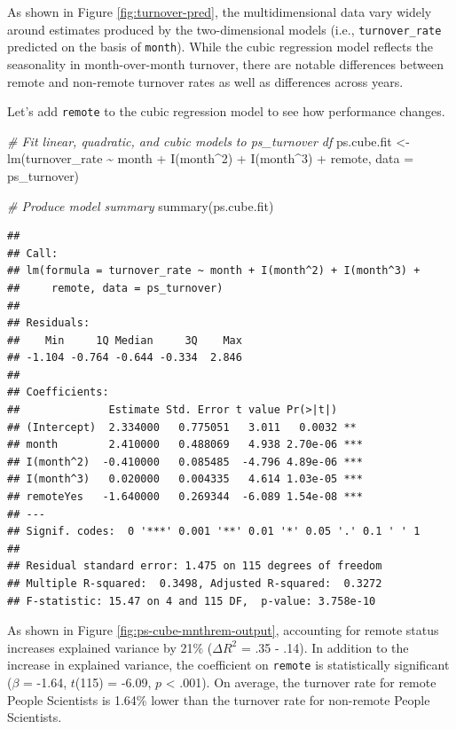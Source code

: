 \documentclass[
]{book}
\newenvironment{Shaded}{\begin{snugshade}}{\end{snugshade}}
\newcommand{\AttributeTok}[1]{\textcolor[rgb]{0.77,0.63,0.00}{#1}}
\newcommand{\CommentTok}[1]{\textcolor[rgb]{0.56,0.35,0.01}{\textit{#1}}}
\newcommand{\DecValTok}[1]{\textcolor[rgb]{0.00,0.00,0.81}{#1}}
\newcommand{\FunctionTok}[1]{\textcolor[rgb]{0.00,0.00,0.00}{#1}}
\newcommand{\NormalTok}[1]{#1}
\newcommand{\OtherTok}[1]{\textcolor[rgb]{0.56,0.35,0.01}{#1}}
\newcommand{\SpecialCharTok}[1]{\textcolor[rgb]{0.00,0.00,0.00}{#1}}
\begin{document}
As shown in Figure \ref{fig:turnover-pred}, the multidimensional data vary widely around estimates produced by the two-dimensional models (i.e., \texttt{turnover\_rate} predicted on the basis of \texttt{month}). While the cubic regression model reflects the seasonality in month-over-month turnover, there are notable differences between remote and non-remote turnover rates as well as differences across years.

Let's add \texttt{remote} to the cubic regression model to see how performance changes.

\begin{Shaded}
\begin{Highlighting}[]
\CommentTok{\# Fit linear, quadratic, and cubic models to ps\_turnover df}
\NormalTok{ps.cube.fit }\OtherTok{\textless{}{-}} \FunctionTok{lm}\NormalTok{(turnover\_rate }\SpecialCharTok{\textasciitilde{}}\NormalTok{ month }\SpecialCharTok{+} \FunctionTok{I}\NormalTok{(month}\SpecialCharTok{\^{}}\DecValTok{2}\NormalTok{) }\SpecialCharTok{+} \FunctionTok{I}\NormalTok{(month}\SpecialCharTok{\^{}}\DecValTok{3}\NormalTok{) }\SpecialCharTok{+}\NormalTok{ remote, }\AttributeTok{data =}\NormalTok{ ps\_turnover)}

\CommentTok{\# Produce model summary}
\FunctionTok{summary}\NormalTok{(ps.cube.fit)}
\end{Highlighting}
\end{Shaded}

\begin{verbatim}
## 
## Call:
## lm(formula = turnover_rate ~ month + I(month^2) + I(month^3) + 
##     remote, data = ps_turnover)
## 
## Residuals:
##    Min     1Q Median     3Q    Max 
## -1.104 -0.764 -0.644 -0.334  2.846 
## 
## Coefficients:
##              Estimate Std. Error t value Pr(>|t|)    
## (Intercept)  2.334000   0.775051   3.011   0.0032 ** 
## month        2.410000   0.488069   4.938 2.70e-06 ***
## I(month^2)  -0.410000   0.085485  -4.796 4.89e-06 ***
## I(month^3)   0.020000   0.004335   4.614 1.03e-05 ***
## remoteYes   -1.640000   0.269344  -6.089 1.54e-08 ***
## ---
## Signif. codes:  0 '***' 0.001 '**' 0.01 '*' 0.05 '.' 0.1 ' ' 1
## 
## Residual standard error: 1.475 on 115 degrees of freedom
## Multiple R-squared:  0.3498, Adjusted R-squared:  0.3272 
## F-statistic: 15.47 on 4 and 115 DF,  p-value: 3.758e-10
\end{verbatim}

As shown in Figure \ref{fig:ps-cube-mnthrem-output}, accounting for remote status increases explained variance by 21\% (\(\Delta R^2\) = .35 - .14). In addition to the increase in explained variance, the coefficient on \texttt{remote} is statistically significant (\(\beta\) = -1.64, \(t\)(115) = -6.09, \(p\) \textless{} .001). On average, the turnover rate for remote People Scientists is 1.64\% lower than the turnover rate for non-remote People Scientists.
\end{document}
